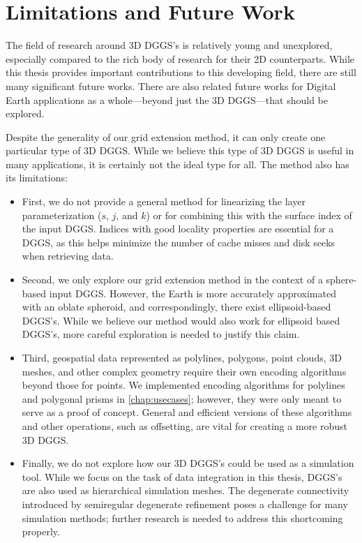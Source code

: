 \section{Limitations and Future Work}
The field of research around 3D DGGS's is relatively young and unexplored, especially compared to the rich body of research for their 2D counterparts.
While this thesis provides important contributions to this developing field, there are still many significant future works.
There are also related future works for Digital Earth applications as a whole---beyond just the 3D DGGS---that should be explored.


Despite the generality of our grid extension method, it can only create one particular type of 3D DGGS.
While we believe this type of 3D DGGS is useful in many applications, it is certainly not the ideal type for all.
The method also has its limitations:
%
\begin{itemize}
	\item First, we do not provide a general method for linearizing the layer parameterization ($s$, $j$, and $k$) or for combining this with the surface index of the input DGGS.
	Indices with good locality properties are essential for a DGGS, as this helps minimize the number of cache misses and disk seeks when retrieving data.

	\item Second, we only explore our grid extension method in the context of a sphere-based input DGGS.
	However, the Earth is more accurately approximated with an oblate spheroid, and correspondingly, there exist ellipsoid-based DGGS's.
	While we believe our method would also work for ellipsoid based DGGS's, more careful exploration is needed to justify this claim.

	\item Third, geospatial data represented as polylines, polygons, point clouds, 3D meshes, and other complex geometry require their own encoding algorithms beyond those for points.
	We implemented encoding algorithms for polylines and polygonal prisms in \cref{chap:usecases}; however, they were only meant to serve as a proof of concept.
	General and efficient versions of these algorithms and other operations, such as offsetting, are vital for creating a more robust 3D DGGS.

	\item Finally, we do not explore how our 3D DGGS's could be used as a simulation tool.
	While we focus on the task of data integration in this thesis, DGGS's are also used as hierarchical simulation meshes.
	The degenerate connectivity introduced by semiregular degenerate refinement poses a challenge for many simulation methods; further research is needed to address this shortcoming properly.
\end{itemize}


